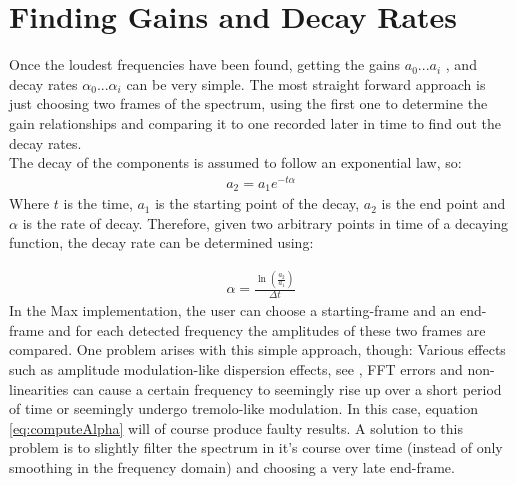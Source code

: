 \section{Finding Gains and Decay Rates}
\label{sec:gainsAndDecays}

Once the loudest frequencies have been found, getting the gains \(a_0 ... a_i\) ,  and decay rates \(\alpha_0 ... \alpha_i\) can be very simple. The most straight forward approach is just choosing two frames of the spectrum, using the first one to determine the gain relationships and comparing it to one recorded later in time to find out the decay rates. \\
The decay of the components is assumed to follow an exponential law, so:
\begin{align}
	a_2 = a_1 e^{-t\alpha}
\end{align}
Where \(t\) is the time, \(a_1\) is the starting point of the decay, \(a_2\) is the end point and \(\alpha\) is the rate of decay. Therefore, given two arbitrary points in time of a decaying function, the decay rate can be determined using:

\begin{align}
	\label{eq:computeAlpha}
	\alpha = \frac {\ln(\frac{a_2}{a_1})} {\Delta t}
\end{align}
In the Max implementation, the user can choose a starting-frame and an end-frame and for each detected frequency the amplitudes of these two frames are compared. One problem arises with this simple approach, though: Various effects such as amplitude modulation-like dispersion effects, see \citep[p. 445]{farnell_designing_2010}, FFT errors and non-linearities can cause a certain frequency to seemingly rise up over a short period of time or seemingly undergo tremolo-like modulation. In this case, equation \ref{eq:computeAlpha} will of course produce faulty results. A solution to this problem is to slightly filter the spectrum in it's course over time (instead of only smoothing in the frequency domain) and choosing a very \glqq{}late\grqq{} end-frame.\\

